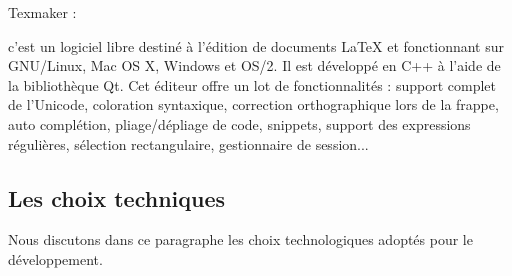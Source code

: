 \begin{description}
{\bf \item Texmaker :}
c'est un logiciel libre destiné à l'édition de documents LaTeX et fonctionnant sur GNU/Linux, Mac OS X, Windows et OS/2. Il est développé en C++ à l'aide de la bibliothèque Qt.
Cet éditeur offre un lot de fonctionnalités : support complet de l'Unicode, coloration syntaxique, correction orthographique lors de la frappe, auto complétion, pliage/dépliage de code, snippets, support des expressions régulières, sélection rectangulaire, gestionnaire de session...
\end{description}
\subsection{Les choix techniques }
Nous discutons dans ce paragraphe les choix technologiques adoptés pour le développement.
